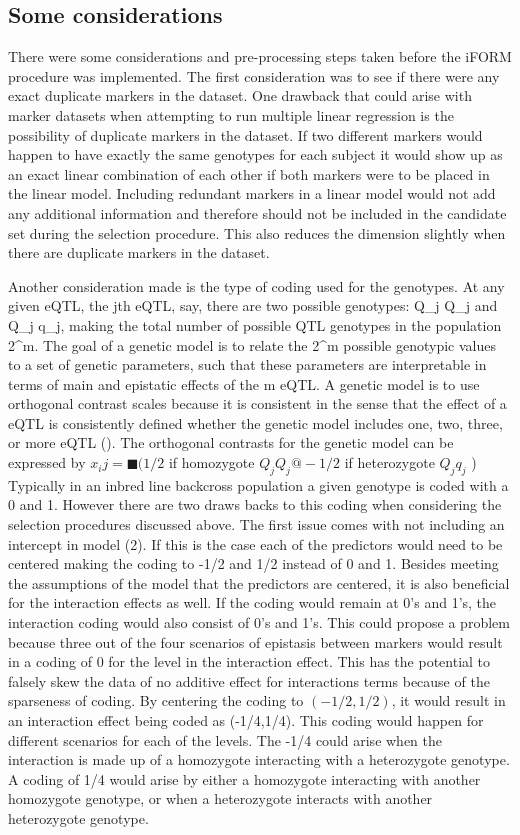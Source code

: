\documentclass[]{book}
\theoremstyle{definition}
\theoremstyle{definition}
\theoremstyle{remark}
\begin{document}
\subsection{Some considerations}\label{some-considerations}

There were some considerations and pre-processing steps taken before the
iFORM procedure was implemented. The first consideration was to see if
there were any exact duplicate markers in the dataset. One drawback that
could arise with marker datasets when attempting to run multiple linear
regression is the possibility of duplicate markers in the dataset. If
two different markers would happen to have exactly the same genotypes
for each subject it would show up as an exact linear combination of each
other if both markers were to be placed in the linear model. Including
redundant markers in a linear model would not add any additional
information and therefore should not be included in the candidate set
during the selection procedure. This also reduces the dimension slightly
when there are duplicate markers in the dataset.

Another consideration made is the type of coding used for the genotypes.
At any given eQTL, the jth eQTL, say, there are two possible genotypes:
Q\_j Q\_j and Q\_j q\_j, making the total number of possible QTL
genotypes in the population 2\^{}m. The goal of a genetic model is to
relate the 2\^{}m possible genotypic values to a set of genetic
parameters, such that these parameters are interpretable in terms of
main and epistatic effects of the m eQTL. A genetic model is to use
orthogonal contrast scales because it is consistent in the sense that
the effect of a eQTL is consistently defined whether the genetic model
includes one, two, three, or more eQTL (\cite{kao2002modeling}). The
orthogonal contrasts for the genetic model can be expressed by
\(x_ij=■(1/2\) if homozygote \(Q_j Q_j@-1/2\) if heterozygote
\(Q_j q_j\) ) Typically in an inbred line backcross population a given
genotype is coded with a 0 and 1. However there are two draws backs to
this coding when considering the selection procedures discussed above.
The first issue comes with not including an intercept in model (2). If
this is the case each of the predictors would need to be centered making
the coding to -1/2 and 1/2 instead of 0 and 1. Besides meeting the
assumptions of the model that the predictors are centered, it is also
beneficial for the interaction effects as well. If the coding would
remain at 0's and 1's, the interaction coding would also consist of 0's
and 1's. This could propose a problem because three out of the four
scenarios of epistasis between markers would result in a coding of 0 for
the level in the interaction effect. This has the potential to falsely
skew the data of no additive effect for interactions terms because of
the sparseness of coding. By centering the coding to \((-1/2,1/2)\), it
would result in an interaction effect being coded as (-1/4,1/4). This
coding would happen for different scenarios for each of the levels. The
-1/4 could arise when the interaction is made up of a homozygote
interacting with a heterozygote genotype. A coding of 1/4 would arise by
either a homozygote interacting with another homozygote genotype, or
when a heterozygote interacts with another heterozygote genotype.
\end{document}
